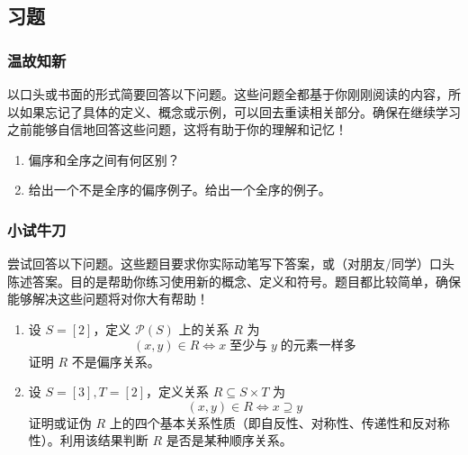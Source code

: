 
\subsection{习题}

\subsubsection*{温故知新}

以口头或书面的形式简要回答以下问题。这些问题全都基于你刚刚阅读的内容，所以如果忘记了具体的定义、概念或示例，可以回去重读相关部分。确保在继续学习之前能够自信地回答这些问题，这将有助于你的理解和记忆！

\begin{enumerate}[label=(\arabic*)]
    \item 偏序和全序之间有何区别？
    \item 给出一个不是全序的偏序例子。给出一个全序的例子。
\end{enumerate}

\subsubsection*{小试牛刀}

尝试回答以下问题。这些题目要求你实际动笔写下答案，或（对朋友/同学）口头陈述答案。目的是帮助你练习使用新的概念、定义和符号。题目都比较简单，确保能够解决这些问题将对你大有帮助！

\begin{enumerate}[label=(\arabic*)]
    \item 设 $S=[2]$，定义 $\mathcal{P}(S)$ 上的关系 $R$ 为 
    \[(x, y) \in R \iff x \;\text{至少与}\; y \;\text{的元素一样多}\]
    证明 $R$ 不是偏序关系。
    \item 设 $S=[3], T=[2]$，定义关系 $R \subseteq S \times T$ 为
    \[(x, y) \in R \iff x \supseteq y\]
    证明或证伪 $R$ 上的四个基本关系性质（即自反性、对称性、传递性和反对称性）。利用该结果判断 $R$ 是否是某种顺序关系。
\end{enumerate}